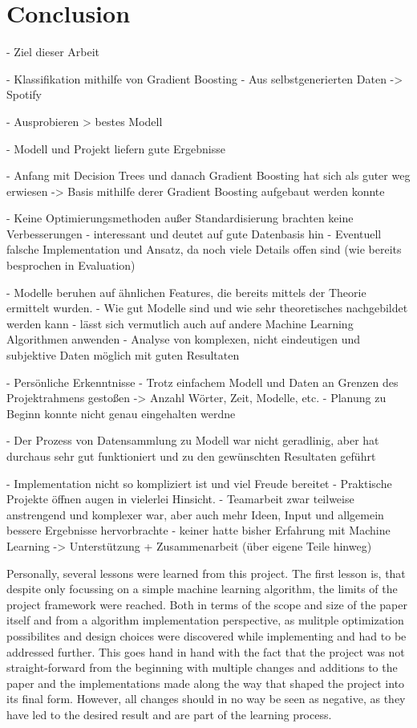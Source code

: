 \section{Conclusion}

- Ziel dieser Arbeit 

    - Klassifikation mithilfe von Gradient Boosting 
    - Aus selbstgenerierten Daten -> Spotify

    - Ausprobieren > bestes Modell 

- Modell und Projekt liefern gute Ergebnisse 

    - Anfang mit Decision Trees und danach Gradient Boosting hat sich als guter weg erwiesen
        -> Basis mithilfe derer Gradient Boosting aufgebaut werden konnte 

    - Keine Optimierungsmethoden außer Standardisierung brachten keine Verbesserungen
        - interessant und deutet auf gute Datenbasis hin 
        - Eventuell falsche Implementation und Ansatz, da noch viele Details offen sind (wie bereits besprochen in Evaluation)

    - Modelle beruhen auf ähnlichen Features, die bereits mittels der Theorie ermittelt wurden. 
        - Wie gut Modelle sind und wie sehr theoretisches nachgebildet werden kann
        - lässt sich vermutlich auch auf andere Machine Learning Algorithmen anwenden 
            - Analyse von komplexen, nicht eindeutigen und subjektive Daten möglich mit guten Resultaten 

-   Persönliche Erkenntnisse
    - Trotz einfachem Modell und Daten an Grenzen des Projektrahmens gestoßen -> Anzahl Wörter, Zeit, Modelle, etc. 
        - Planung zu Beginn konnte nicht genau eingehalten werdne 

    - Der Prozess von Datensammlung zu Modell war nicht geradlinig, aber hat durchaus sehr gut funktioniert und zu den 
      gewünschten Resultaten geführt 

    - Implementation nicht so kompliziert ist und viel Freude bereitet
    - Praktische Projekte öffnen augen in vielerlei Hinsicht. 
    - Teamarbeit zwar teilweise anstrengend und komplexer war, aber auch mehr Ideen, Input und allgemein bessere Ergebnisse hervorbrachte 
        - keiner hatte bisher Erfahrung mit Machine Learning -> Unterstützung  + Zusammenarbeit (über eigene Teile hinweg)


    Personally, several lessons were learned from this project. The first lesson is, that despite only focussing on a 
    simple machine learning algorithm, the limits of the project framework were reached. Both in terms of the scope and size of the
    paper itself and from a algorithm implementation perspective, as mulitple optimization possibilites and design choices were 
    discovered while implementing and had to be addressed further. This goes hand in hand with the fact that the project was not straight-forward
    from the beginning with multiple changes and additions to the paper and the implementations made along the way that shaped the 
    project into its final form. However, all changes should in no way be seen as negative, as they have led to the desired result and 
    are part of the learning process.



